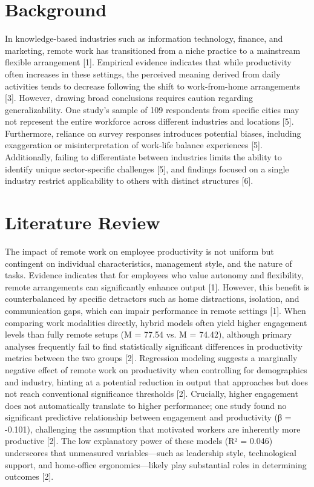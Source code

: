 \documentclass[conference]{IEEEtran}
\begin{document}
\section{Background}
In knowledge-based industries such as information technology, finance, and marketing, remote work has transitioned from a niche practice to a mainstream flexible arrangement [1]. Empirical evidence indicates that while productivity often increases in these settings, the perceived meaning derived from daily activities tends to decrease following the shift to work-from-home arrangements [3]. However, drawing broad conclusions requires caution regarding generalizability. One study's sample of 109 respondents from specific cities may not represent the entire workforce across different industries and locations [5]. Furthermore, reliance on survey responses introduces potential biases, including exaggeration or misinterpretation of work-life balance experiences [5]. Additionally, failing to differentiate between industries limits the ability to identify unique sector-specific challenges [5], and findings focused on a single industry restrict applicability to others with distinct structures [6].

\section{Literature Review}
The impact of remote work on employee productivity is not uniform but contingent on individual characteristics, management style, and the nature of tasks. Evidence indicates that for employees who value autonomy and flexibility, remote arrangements can significantly enhance output [1]. However, this benefit is counterbalanced by specific detractors such as home distractions, isolation, and communication gaps, which can impair performance in remote settings [1]. When comparing work modalities directly, hybrid models often yield higher engagement levels than fully remote setups (M = 77.54 vs. M = 74.42), although primary analyses frequently fail to find statistically significant differences in productivity metrics between the two groups [2]. Regression modeling suggests a marginally negative effect of remote work on productivity when controlling for demographics and industry, hinting at a potential reduction in output that approaches but does not reach conventional significance thresholds [2]. Crucially, higher engagement does not automatically translate to higher performance; one study found no significant predictive relationship between engagement and productivity (β = -0.101), challenging the assumption that motivated workers are inherently more productive [2]. The low explanatory power of these models (R² = 0.046) underscores that unmeasured variables—such as leadership style, technological support, and home-office ergonomics—likely play substantial roles in determining outcomes [2].
\end{document}
